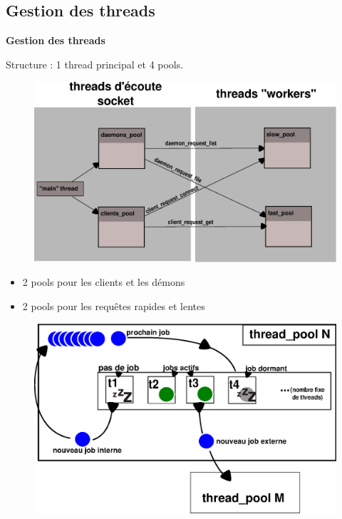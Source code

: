 \documentclass{beamer}
\begin{document}
\begin{frame}
    \section{Gestion des threads}

    \textbf{Gestion des threads}

    Structure : 1 thread principal et 4 pools.
\begin{center}
\begin{figure}[htbp]
    \centering
    \includegraphics[scale=0.4]{pools_interacting.eps}
\end{figure}
\end{center}

\end{frame}

\begin{frame}
    \begin{itemize}
        \item 2 pools pour les clients et les démons
        \item 2 pools pour les requêtes rapides et lentes
    \end{itemize}
\begin{center}
\begin{figure}[htbp]
    \centering
    \includegraphics[scale=0.6]{thread_pool.eps}
\end{figure}
\end{center}

\end{frame}
\end{document}
